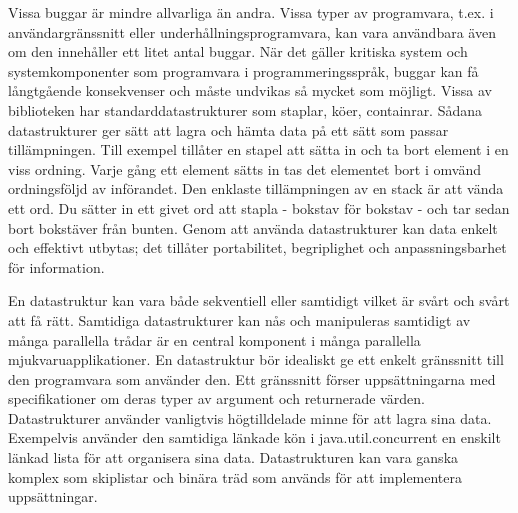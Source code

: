 Vissa buggar är mindre allvarliga än andra. Vissa typer av programvara, t.ex. i användargränssnitt eller underhållningsprogramvara, kan vara användbara även om den innehåller ett litet antal buggar.
När det gäller kritiska system och systemkomponenter som programvara i programmeringsspråk,
buggar kan få långtgående konsekvenser och måste undvikas så mycket som möjligt.
Vissa av biblioteken har standarddatastrukturer som staplar, köer, containrar. Sådana datastrukturer ger sätt att lagra
och hämta data på ett sätt som passar tillämpningen. Till exempel tillåter en stapel att sätta in och ta bort element i en viss ordning. Varje gång ett element sätts in tas det elementet bort
i omvänd ordningsföljd av införandet. Den enklaste tillämpningen av en stack är att vända ett ord. Du sätter in ett givet ord att stapla - bokstav för bokstav - och tar sedan bort bokstäver från bunten.
Genom att använda datastrukturer kan data enkelt och effektivt utbytas; det tillåter portabilitet, begriplighet och anpassningsbarhet för information.

En datastruktur kan vara både sekventiell eller samtidigt vilket är svårt och svårt att få rätt. Samtidiga datastrukturer kan nås och manipuleras samtidigt av många parallella trådar är en central komponent i många parallella mjukvaruapplikationer. En datastruktur bör idealiskt ge ett enkelt gränssnitt till den programvara som använder den. Ett gränssnitt förser uppsättningarna med specifikationer om deras typer av argument och returnerade värden. Datastrukturer använder vanligtvis högtilldelade minne för att lagra sina data. Exempelvis använder den samtidiga länkade kön i java.util.concurrent en enskilt länkad lista för att organisera sina data. Datastrukturen kan vara ganska komplex som skiplistar och binära träd som används för att implementera uppsättningar.


